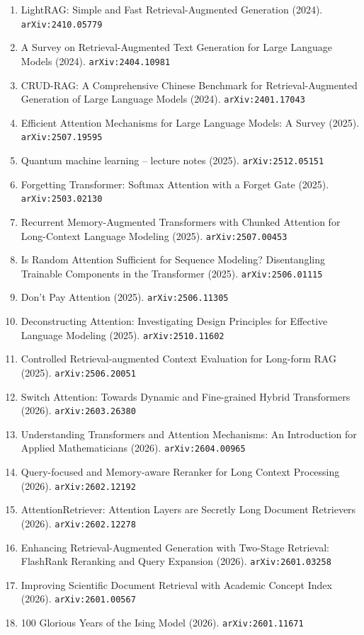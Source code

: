 \documentclass[11pt]{article}
\begin{document}
\begin{enumerate}
  \item LightRAG: Simple and Fast Retrieval-Augmented Generation (2024). \texttt{arXiv:2410.05779}
  \item A Survey on Retrieval-Augmented Text Generation for Large Language Models (2024). \texttt{arXiv:2404.10981}
  \item CRUD-RAG: A Comprehensive Chinese Benchmark for Retrieval-Augmented
  Generation of Large Language Models (2024). \texttt{arXiv:2401.17043}
  \item Efficient Attention Mechanisms for Large Language Models: A Survey (2025). \texttt{arXiv:2507.19595}
  \item Quantum machine learning -- lecture notes (2025). \texttt{arXiv:2512.05151}
  \item Forgetting Transformer: Softmax Attention with a Forget Gate (2025). \texttt{arXiv:2503.02130}
  \item Recurrent Memory-Augmented Transformers with Chunked Attention for Long-Context Language Modeling (2025). \texttt{arXiv:2507.00453}
  \item Is Random Attention Sufficient for Sequence Modeling? Disentangling Trainable Components in the Transformer (2025). \texttt{arXiv:2506.01115}
  \item Don't Pay Attention (2025). \texttt{arXiv:2506.11305}
  \item Deconstructing Attention: Investigating Design Principles for Effective Language Modeling (2025). \texttt{arXiv:2510.11602}
  \item Controlled Retrieval-augmented Context Evaluation for Long-form RAG (2025). \texttt{arXiv:2506.20051}
  \item Switch Attention: Towards Dynamic and Fine-grained Hybrid Transformers (2026). \texttt{arXiv:2603.26380}
  \item Understanding Transformers and Attention Mechanisms: An Introduction for Applied Mathematicians (2026). \texttt{arXiv:2604.00965}
  \item Query-focused and Memory-aware Reranker for Long Context Processing (2026). \texttt{arXiv:2602.12192}
  \item AttentionRetriever: Attention Layers are Secretly Long Document Retrievers (2026). \texttt{arXiv:2602.12278}
  \item Enhancing Retrieval-Augmented Generation with Two-Stage Retrieval: FlashRank Reranking and Query Expansion (2026). \texttt{arXiv:2601.03258}
  \item Improving Scientific Document Retrieval with Academic Concept Index (2026). \texttt{arXiv:2601.00567}
  \item 100 Glorious Years of the Ising Model (2026). \texttt{arXiv:2601.11671}
\end{enumerate}
\end{document}
